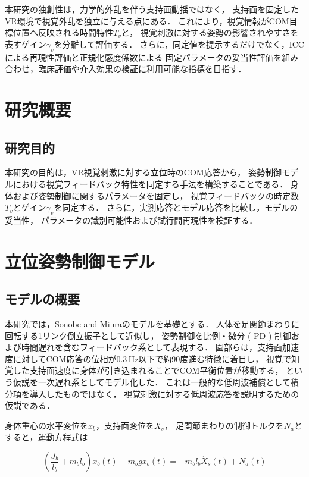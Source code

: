 \documentclass[a4paper,9pt,twocolumn]{ltjsarticle}
\begin{document}
本研究の独創性は，力学的外乱を伴う支持面動揺ではなく，
支持面を固定したVR環境で視覚外乱を独立に与える点にある．
これにより，視覚情報がCOM目標位置へ反映される時間特性$T_v$と，
視覚刺激に対する姿勢の影響されやすさを表すゲイン$\gamma_v$を分離して評価する．
さらに，同定値を提示するだけでなく，ICCによる再現性評価と正規化感度係数による
固定パラメータの妥当性評価を組み合わせ，臨床評価や介入効果の検証に利用可能な指標を目指す．

\section{研究概要}

\subsection{研究目的}

本研究の目的は，VR視覚刺激に対する立位時のCOM応答から，
姿勢制御モデルにおける視覚フィードバック特性を同定する手法を構築することである．
身体および姿勢制御に関するパラメータを固定し，
視覚フィードバックの時定数$T_v$とゲイン$\gamma_v$を同定する．
さらに，実測応答とモデル応答を比較し，モデルの妥当性，
パラメータの識別可能性および試行間再現性を検証する．

\section{立位姿勢制御モデル}

\subsection{モデルの概要}

本研究では，Sonobe and Miuraのモデル\cite{sonobe2025}を基礎とする．
人体を足関節まわりに回転する1リンク倒立振子として近似し，
姿勢制御を比例・微分 ( PD ) 制御および時間遅れを含むフィードバック系として表現する．
園部らは，支持面加速度に対してCOM応答の位相が0.3\,Hz以下で約90度進む特徴に着目し，
視覚で知覚した支持面速度に身体が引き込まれることでCOM平衡位置が移動する，
という仮説を一次遅れ系としてモデル化した\cite{sonobe2025}．
これは一般的な低周波補償として積分項を導入したものではなく，
視覚刺激に対する低周波応答を説明するための仮説である．

身体重心の水平変位を$x_b$，支持面変位を$X_s$，
足関節まわりの制御トルクを$N_a$とすると，運動方程式は

\begin{equation}
  (\frac{J_b}{l_b}+m_b l_b)\ddot{x}_b(t)-m_b g x_b(t)
  =-m_b l_b\ddot{X}_s(t)+N_a(t)
  \label{eq:motion}
\end{equation}
\end{document}
